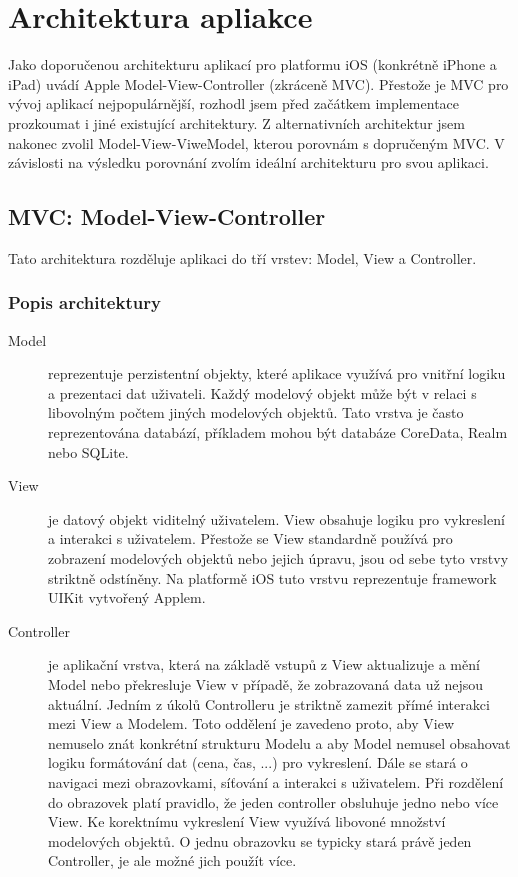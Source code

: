\section{Architektura apliakce}\label{analyza-architektura}

Jako doporučenou architekturu aplikací pro platformu iOS (konkrétně iPhone a iPad) uvádí Apple Model-View-Controller (zkráceně MVC).
Přestože je MVC pro vývoj aplikací nejpopulárnější, rozhodl jsem před začátkem implementace prozkoumat i jiné existující architektury.
Z alternativních architektur jsem nakonec zvolil Model-View-ViweModel, kterou porovnám s dopručeným MVC.
V závislosti na výsledku porovnání zvolím ideální architekturu pro svou aplikaci.

\subsection{MVC: Model-View-Controller}\label{analyza-mvc}
Tato architektura rozděluje aplikaci do tří vrstev: Model, View a Controller.

\subsubsection{Popis architektury}

\begin{description}
  \item[Model] reprezentuje perzistentní objekty, které aplikace využívá pro vnitřní logiku a prezentaci dat uživateli.
  Každý modelový objekt může být v relaci s libovolným počtem jiných modelových objektů.
  Tato vrstva je často reprezentována databází, příkladem mohou být databáze CoreData, Realm nebo SQLite.

  \item[View] je datový objekt viditelný uživatelem. View obsahuje logiku pro vykreslení a interakci s uživatelem.
  Přestože se View standardně používá pro zobrazení modelových objektů nebo jejich úpravu, jsou od sebe tyto vrstvy striktně odstíněny.
  Na platformě iOS tuto vrstvu reprezentuje framework UIKit vytvořený Applem.

  \item[Controller] je aplikační vrstva, která na základě vstupů z View aktualizuje a mění Model nebo překresluje View v případě, že zobrazovaná data už nejsou aktuální.
  Jedním z úkolů Controlleru je striktně zamezit přímé interakci mezi View a Modelem.
  Toto oddělení je zavedeno proto, aby View nemuselo znát konkrétní strukturu Modelu a aby Model nemusel obsahovat logiku formátování dat (cena, čas, ...) pro vykreslení.
  Dále se stará o navigaci mezi obrazovkami, síťování a interakci s uživatelem.
  Při rozdělení do obrazovek platí pravidlo, že jeden controller obsluhuje jedno nebo více View.
  Ke korektnímu vykreslení View využívá libovoné množství modelových objektů.
  O jednu obrazovku se typicky stará právě jeden Controller, je ale možné jich použít více.
\end{description}

